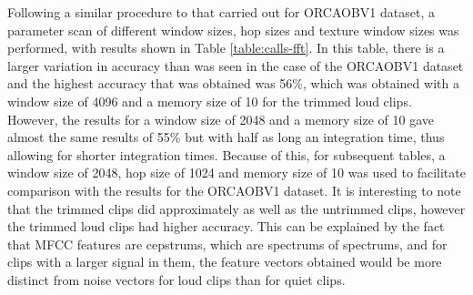 Following a similar procedure to that carried out for ORCAOBV1
dataset, a parameter scan of different window sizes, hop sizes and
texture window sizes was performed, with results shown in Table
\ref{table:calls-fft}.  In this table, there is a larger variation in
accuracy than was seen in the case of the ORCAOBV1 dataset and the
highest accuracy that was obtained was 56\%, which was obtained with a
window size of 4096 and a memory size of 10 for the trimmed loud
clips.  However, the results for a window size of 2048 and a memory
size of 10 gave almost the same results of 55\% but with half as long
an integration time, thus allowing for shorter integration
times. Because of this, for subsequent tables, a window size of 2048,
hop size of 1024 and memory size of 10 was used to facilitate
comparison with the results for the ORCAOBV1 dataset.  It is
interesting to note that the trimmed clips did approximately as well
as the untrimmed clips, however the trimmed loud clips had higher
accuracy.  This can be explained by the fact that MFCC features are
cepstrums, which are spectrums of spectrums, and for clips with a
larger signal in them, the feature vectors obtained would be more
distinct from noise vectors for loud clips than for quiet clips.

